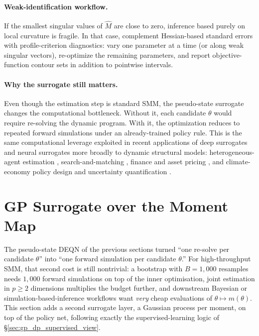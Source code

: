 \documentclass[11pt,a4paper]{report}
\begin{document}
\paragraph{Weak-identification workflow.}  If the smallest singular values of $\hat{M}$ are close to zero, inference based purely on local curvature is fragile.  In that case, complement Hessian-based standard errors with profile-criterion diagnostics: vary one parameter at a time (or along weak singular vectors), re-optimize the remaining parameters, and report objective-function contour sets in addition to pointwise intervals.

\paragraph{Why the surrogate still matters.}  Even though the estimation step is standard SMM, the pseudo-state surrogate changes the computational bottleneck.  Without it, each candidate $\theta$ would require re-solving the dynamic program.  With it, the optimization reduces to repeated forward simulations under an already-trained policy rule.  This is the same computational leverage exploited in recent applications of deep surrogates and neural surrogates more broadly to dynamic structural models: heterogeneous-agent estimation \citep{kase2022estimating}, search-and-matching \citep{payne2024deepsam}, finance and asset pricing \citep{chen2025Deep}, and climate-economy policy design and uncertainty quantification \citep{kubler2025using, friedlDeep2023}.

\section{GP Surrogate over the Moment Map}
\label{sec:smm_gp_moments}

The pseudo-state DEQN of the previous sections turned ``one re-solve per candidate $\theta$'' into ``one forward simulation per candidate $\theta$.''  For high-throughput SMM, that second cost is still nontrivial: a bootstrap with $B = 1{,}000$ resamples needs $1{,}000$ forward simulations on top of the inner optimisation, joint estimation in $p \ge 2$ dimensions multiplies the budget further, and downstream Bayesian or simulation-based-inference workflows want \emph{very} cheap evaluations of $\theta \mapsto m(\theta)$.  This section adds a second surrogate layer, a Gaussian process per moment, on top of the policy net, following exactly the supervised-learning logic of \S\ref{sec:gp_dp_supervised_view}.
\end{document}
